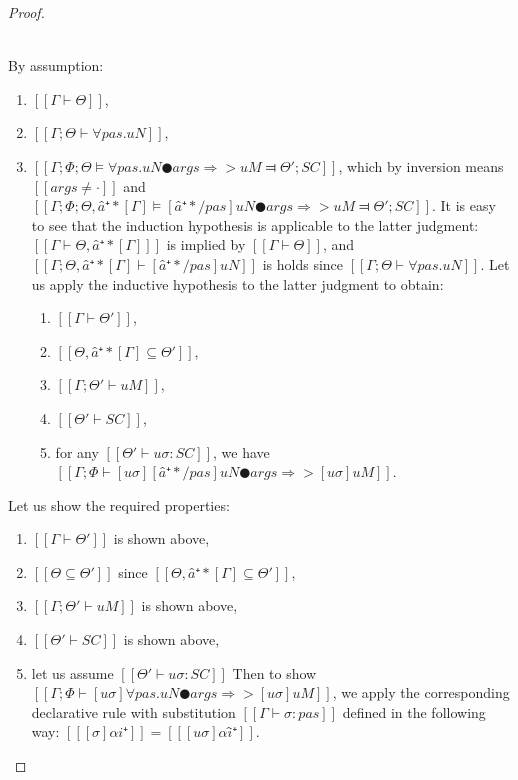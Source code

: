 \begin{proof}
\begin{caseof}
        \item {}\\
        By assumption:
        \begin{enumerate}
            \item $[[Γ ⊢ Θ]]$,
            \item $[[Γ; Θ ⊢ ∀pas.uN]]$,
            \item $[[Γ; Φ; Θ ⊨ ∀pas.uN ● args ⇒> uM ⫤ Θ'; SC]]$, which by inversion means
                $[[args ≠ ·]]$ and $[[Γ; Φ; Θ, â⁺*[Γ] ⊨ [â⁺*/pas]uN ● args ⇒> uM ⫤ Θ'; SC]]$.
                It is easy to see that the induction hypothesis is applicable to the latter judgment:
                $[[Γ ⊢ Θ, â⁺*[Γ] ]]$ is implied by $[[Γ ⊢ Θ]]$, and $[[Γ; Θ, â⁺*[Γ] ⊢ [â⁺*/pas]uN]]$
                is holds since $[[Γ; Θ ⊢ ∀pas.uN]]$.
                Let us apply the inductive hypothesis to the latter judgment to obtain:
                \begin{enumerate}
                    \item $[[Γ ⊢ Θ']]$,
                    \item $[[Θ, â⁺*[Γ] ⊆ Θ']]$,
                    \item $[[Γ; Θ' ⊢ uM]]$,
                    \item $[[Θ' ⊢ SC]]$,
                    \item for any $[[Θ' ⊢ uσ : SC]]$, we have $[[ Γ ; Φ ⊢ [uσ][â⁺*/pas]uN ● args ⇒> [uσ]uM ]]$.
                \end{enumerate}
        \end{enumerate}

        Let us show the required properties:
        \begin{enumerate}
            \item $[[Γ ⊢ Θ']]$ is shown above,
            \item $[[Θ ⊆ Θ']]$ since $[[Θ, â⁺*[Γ] ⊆ Θ']]$,
            \item $[[Γ; Θ' ⊢ uM]]$ is shown above,
            \item $[[Θ' ⊢ SC]]$ is shown above,
            \item let us assume $[[Θ' ⊢ uσ : SC]]$
            Then to show $[[ Γ ; Φ ⊢ [uσ]∀pas.uN ● args ⇒> [uσ]uM ]]$,
            we apply the corresponding declarative rule 
            with substitution $[[ Γ ⊢ σ : pas ]]$  defined in the following way:
            $[[ [σ]αi⁺ ]] = [[ [uσ]αî⁺ ]]$.


\end{enumerate}
\end{caseof}
\end{proof}
